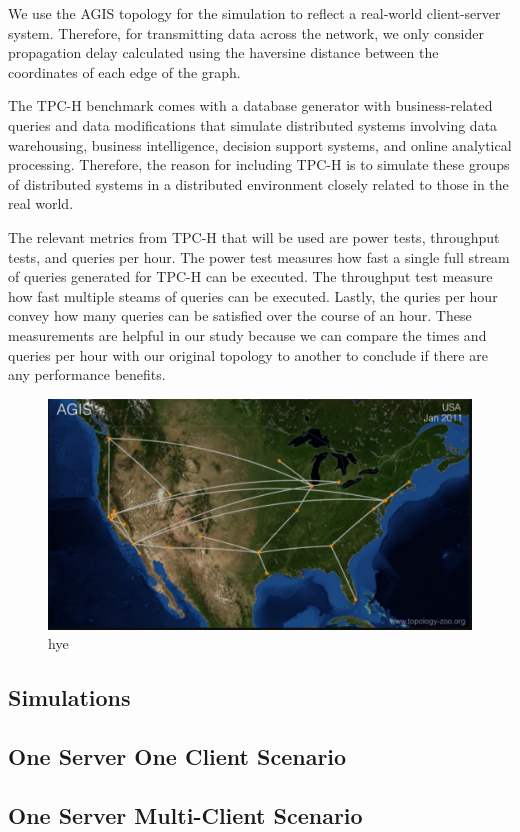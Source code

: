 \indent We use the AGIS topology for the simulation to reflect a real-world client-server system. Therefore, for transmitting data across the network, we only consider propagation delay calculated using the haversine distance between the coordinates of each edge of the graph.

\indent The TPC-H benchmark comes with a database generator with business-related queries and data modifications that simulate distributed systems involving data warehousing, business intelligence, decision support systems, and online analytical processing. Therefore, the reason for including TPC-H is to simulate these groups of distributed systems in a distributed environment closely related to those in the real world.

\indent The relevant metrics from TPC-H that will be used are power tests, throughput tests, and queries per hour. The power test measures how fast a single full stream of queries generated for TPC-H can be executed. The throughput test measure how fast multiple steams of queries can be executed. Lastly, the quries per hour convey how many queries can be satisfied over the course of an hour. These measurements are helpful in our study because we can compare the times and queries per hour with our original topology to another to conclude if there are any performance benefits.

\begin{figure}[tp]
\centering
\includegraphics[width=0.5 \textwidth]{figures/AGIS_ORIG}
\caption{hye}
\end{figure}

\subsection{Simulations}

\subsection{One Server One Client Scenario}

\subsection{One Server Multi-Client Scenario}

